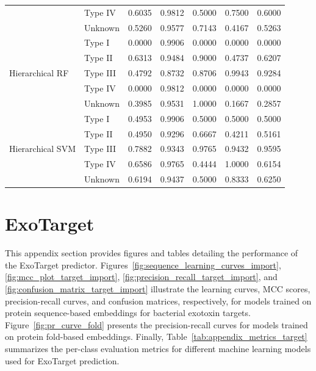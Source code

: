 \begin{table}[H]
{\begin{tabular}{llccccc}
			& Type IV  & 0.6035 & 0.9812 & 0.5000  & 0.7500  & 0.6000  \\
			& Unknown  & 0.5260 & 0.9577 & 0.7143  & 0.4167  & 0.5263  \\
			\midrule
			\multirow{5}{*}{Hierarchical RF} 
			& Type I   & 0.0000 & 0.9906 & 0.0000  & 0.0000  & 0.0000  \\
			& Type II  & 0.6313 & 0.9484 & 0.9000  & 0.4737  & 0.6207  \\
			& Type III & 0.4792 & 0.8732 & 0.8706  & 0.9943  & 0.9284  \\
			& Type IV  & 0.0000 & 0.9812 & 0.0000  & 0.0000  & 0.0000  \\
			& Unknown  & 0.3985 & 0.9531 & 1.0000  & 0.1667  & 0.2857  \\
			\midrule
			\multirow{5}{*}{Hierarchical SVM} 
			& Type I   & 0.4953 & 0.9906 & 0.5000  & 0.5000  & 0.5000  \\
			& Type II  & 0.4950 & 0.9296 & 0.6667  & 0.4211  & 0.5161  \\
			& Type III & 0.7882 & 0.9343 & 0.9765  & 0.9432  & 0.9595  \\
			& Type IV  & 0.6586 & 0.9765 & 0.4444  & 1.0000  & 0.6154  \\
			& Unknown  & 0.6194 & 0.9437 & 0.5000  & 0.8333  & 0.6250  \\
			\bottomrule
		\end{tabular}
		}
		\label{tab:appendix_metrics_type}
\end{table}

\section{ExoTarget}
\label{sec:exotarget_appendix}

This appendix section provides figures and tables detailing the performance of the ExoTarget predictor. 
Figures~\ref{fig:sequence_learning_curves_import}, \ref{fig:mcc_plot_target_import}, \ref{fig:precision_recall_target_import}, and \ref{fig:confusion_matrix_target_import} illustrate the learning curves, MCC scores, precision-recall curves, and confusion matrices, respectively, for models trained on protein sequence-based embeddings for bacterial exotoxin targets. 
Figure~\ref{fig:pr_curve_fold} presents the precision-recall curves for models trained on protein fold-based embeddings. 
Finally, Table~\ref{tab:appendix_metrics_target} summarizes the per-class evaluation metrics for different machine learning models used for ExoTarget prediction.


